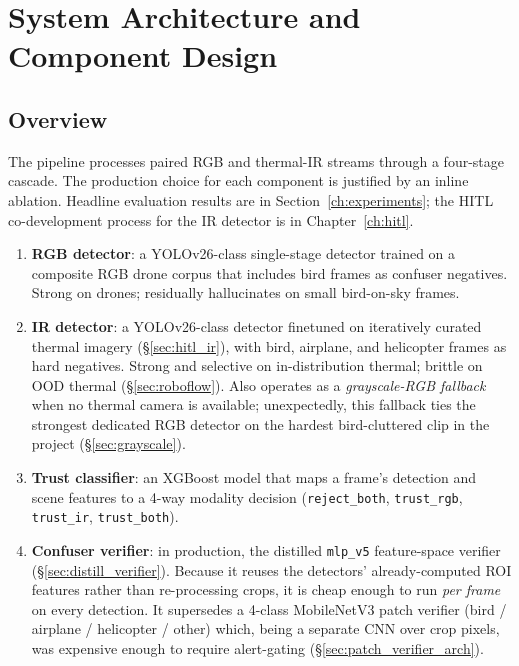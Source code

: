 \section{System Architecture and Component Design}
\label{ch:architecture}

\subsection{Overview}

The pipeline processes paired RGB and thermal-IR streams through a four-stage cascade. The production choice for each component is justified by an inline ablation. Headline evaluation results are in Section~\ref{ch:experiments}; the HITL co-development process for the IR detector is in Chapter~\ref{ch:hitl}.

\begin{enumerate}
    \item \textbf{RGB detector}: a YOLOv26-class single-stage detector trained on a composite RGB drone corpus that includes bird frames as confuser negatives. Strong on drones; residually hallucinates on small bird-on-sky frames.
    \item \textbf{IR detector}: a YOLOv26-class detector finetuned on iteratively curated thermal imagery (\S\ref{sec:hitl_ir}), with bird, airplane, and helicopter frames as hard negatives. Strong and selective on in-distribution thermal; brittle on OOD thermal (\S\ref{sec:roboflow}). Also operates as a \emph{grayscale-RGB fallback} when no thermal camera is available; unexpectedly, this fallback ties the strongest dedicated RGB detector on the hardest bird-cluttered clip in the project (\S\ref{sec:grayscale}).
    \item \textbf{Trust classifier}: an XGBoost model that maps a frame's detection and scene features to a 4-way modality decision (\texttt{reject\_both}, \texttt{trust\_rgb}, \texttt{trust\_ir}, \texttt{trust\_both}).
    \item \textbf{Confuser verifier}: in production, the distilled \texttt{mlp\_v5} feature-space verifier (\S\ref{sec:distill_verifier}). Because it reuses the detectors' already-computed ROI features rather than re-processing crops, it is cheap enough to run \emph{per frame} on every detection. It supersedes a 4-class MobileNetV3 patch verifier (bird / airplane / helicopter / other) which, being a separate CNN over crop pixels, was expensive enough to require alert-gating (\S\ref{sec:patch_verifier_arch}).
\end{enumerate}

